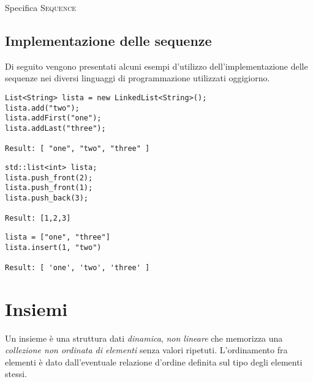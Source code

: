 \begin{algorithm}[H]
	\caption[Specifica sequenza]{Specifica \textsc{Sequence}}
	
\end{algorithm}

\clearpage
\subsection{Implementazione delle sequenze}

Di seguito vengono presentati alcuni esempi d'utilizzo dell'implementazione delle sequenze nei diversi linguaggi di programmazione utilizzati oggigiorno.

\begin{code}
\begin{verbatim}
List<String> lista = new LinkedList<String>();
lista.add("two");
lista.addFirst("one");
lista.addLast("three");

Result: [ "one", "two", "three" ]
\end{verbatim}
\end{code}

\begin{code}
\begin{verbatim}
std::list<int> lista;
lista.push_front(2);
lista.push_front(1);
lista.push_back(3);

Result: [1,2,3]
\end{verbatim}
\end{code}

\begin{code}
\begin{verbatim}
lista = ["one", "three"]
lista.insert(1, "two")

Result: [ 'one', 'two', 'three' ]
\end{verbatim}
\end{code}

\section{Insiemi}

Un insieme è una struttura dati \emph{dinamica}, \emph{non lineare} che memorizza una \emph{collezione non ordinata di elementi} senza valori ripetuti.
L'ordinamento fra elementi è dato dall'eventuale relazione d'ordine definita sul tipo degli elementi stessi.


